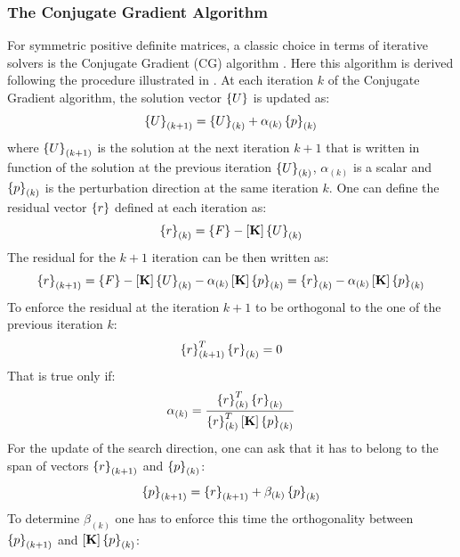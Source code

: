 \subsubsection{The Conjugate Gradient Algorithm}
 For symmetric positive definite matrices, a classic choice in terms of iterative solvers is the Conjugate Gradient (CG) algorithm \cite{hestenes1952methods}. Here  this algorithm is derived following the procedure illustrated in \cite{saad2003iterative}. At each iteration $k$ of the Conjugate Gradient algorithm, the solution vector $\left\lbrace{U}\right \rbrace$ is updated as:
\begin{equation}
\left\lbrace{U}\right \rbrace_{(k+1)}=\left\lbrace{U}\right \rbrace_{(k)}+\alpha_{(k)}\left\lbrace{p}\right \rbrace_{(k)}
\end{equation}
where $\left\lbrace{U}\right \rbrace_{(k+1)}$ is the solution at the next iteration $k+1$ that is written in function of the solution at the previous iteration $\left\lbrace{U}\right \rbrace_{(k)}$, $\alpha_{(k)}$ is a scalar and $\left\lbrace{p}\right \rbrace_{(k)}$ is the perturbation direction at the same iteration $k$. One can define the residual vector $\left\lbrace{r}\right \rbrace$ defined at each iteration as:
\begin{equation}
\left\lbrace{r}\right \rbrace_{(k)}=\left\lbrace{F}\right \rbrace-\left[{\mathbf{K}}\right]\left\lbrace{U}\right \rbrace_{(k)}
\end{equation}
The residual for the $k+1$ iteration can be then written as:
\begin{equation}
\left\lbrace{r}\right \rbrace_{(k+1)}=\left\lbrace{F}\right \rbrace-\left[{\mathbf{K}}\right]\left\lbrace{U}\right \rbrace_{(k)}-\alpha_{(k)}\left[{\mathbf{K}}\right]\left\lbrace{p}\right \rbrace_{(k)}=\left\lbrace{r}\right \rbrace_{(k)}-\alpha_{(k)}\left[{\mathbf{K}}\right]\left\lbrace{p}\right \rbrace_{(k)}
\end{equation}
To enforce the residual at the iteration $k+1$ to be orthogonal to the one of the previous iteration $k$:
\begin{equation}
\left\lbrace{r}\right \rbrace_{(k+1)}^T \left\lbrace{r}\right \rbrace_{(k)}=0
\end{equation}
That is true only if:
\begin{equation}
\alpha_{(k)}=\frac{\left\lbrace{r}\right \rbrace_{(k)}^T\left\lbrace{r}\right \rbrace_{(k)}}{\left\lbrace{r}\right \rbrace_{(k)}^T\left[{\mathbf{K}}\right]\left\lbrace{p}\right \rbrace_{(k)}}
\end{equation}
For the update of the search direction, one can ask that it has to belong to the span of vectors $\left\lbrace{r}\right \rbrace_{(k+1)}$ and $\left\lbrace{p}\right \rbrace_{(k)}$:
\begin{equation}
\label{eq.1.128}
\left\lbrace{p}\right \rbrace_{(k+1)}=\left\lbrace{r}\right \rbrace_{(k+1)} +\beta_{(k)}\left\lbrace{p}\right \rbrace_{(k)}
\end{equation}
To determine $\beta_{(k)}$ one has to enforce this time the orthogonality between $\left\lbrace{p}\right \rbrace_{(k+1)}$ and $\left[{\mathbf{K}}\right]\left\lbrace{p}\right \rbrace_{(k)}$:
